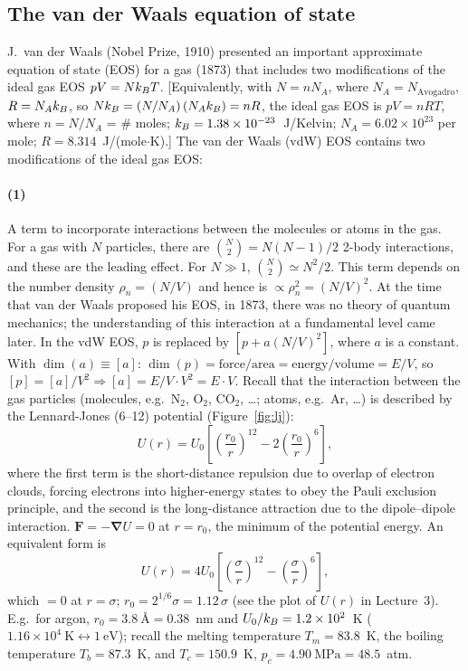 \subsection{The van der Waals equation of state}

J.~van der Waals (Nobel Prize, 1910) presented an important approximate equation of state (EOS) for a gas
(1873) that includes two modifications of the ideal gas EOS $pV = Nk_{B} T$. [Equivalently, with $N = nN_A$,
where $N_A = N_{\text{Avogadro}}$, $R = N_Ak_{B}$, so $Nk_{B} = \left(N/N_A\right)(N_Ak_{B}) = nR$, the ideal gas EOS is
$pV = nRT$, where $n = N/N_A$ = \# moles; $k_{B} = 1.38\times 10^{-23}$~J/Kelvin;
$N_A = 6.02\times 10^{23}$ per mole; $R = 8.314$~J/(mole$\cdot$K).] The van der Waals (vdW) EOS contains two
modifications of the ideal gas EOS:

\paragraph{(1)} A term to incorporate interactions between the molecules or atoms in the gas. For a gas with $N$
particles, there are $\binom N2 = N(N-1)/2$ 2-body interactions, and these are the leading effect. For
$N\gg 1$, $\binom N2\simeq N^2/2$. This term depends on the number density $\rho_n = \left(N/V\right)$ and hence
is $\propto\rho_n^2 = \left(N/V\right)^2$. At the time that van der Waals proposed his EOS, in 1873, there was no theory
of quantum mechanics; the understanding of this interaction at a fundamental level came later. In the vdW EOS,
$p$ is replaced by $\left[p + a\left(N/V\right)^2\right]$, where $a$ is a constant. With $\dim(a)\equiv[a]$:
$\dim(p) = \text{force}/\text{area} = \text{energy}/\text{volume} = E/V$, so
$[p] = [a]/V^2\Rightarrow[a] = E/V\cdot V^2 = E\cdot V$. Recall that the interaction between the gas
particles (molecules, e.g.\ N$_2$, O$_2$, CO$_2$, \ldots; atoms, e.g.\ Ar, \ldots) is described by the
Lennard-Jones (6--12) potential (Figure~\ref{fig:lj}):
\begin{equation}
  U(r) = U_0\left[\left(\frac{r_0}{r}\right)^{12} - 2\left(\frac{r_0}{r}\right)^6\right],
\end{equation}
where the first term is the short-distance repulsion due to overlap of electron clouds, forcing electrons into
higher-energy states to obey the Pauli exclusion principle, and the second is the long-distance attraction due
to the dipole--dipole interaction. $\mathbf F = -\boldsymbol\nabla U = 0$ at $r = r_0$, the minimum of the
potential energy. An equivalent form is
\begin{equation}
  U(r) = 4U_0\left[\left(\frac{\sigma}{r}\right)^{12} - \left(\frac{\sigma}{r}\right)^6\right],
\end{equation}
which $=0$ at $r = \sigma$; $r_0 = 2^{1/6}\sigma = 1.12\,\sigma$ (see the plot of $U(r)$ in Lecture~3).
E.g.\ for argon, $r_0 = 3.8\ \text{\AA} = 0.38$~nm and $U_0/k_{B} = 1.2\times 10^2$~K
($1.16\times 10^4\ \text{K}\leftrightarrow 1\ \text{eV}$); recall the melting temperature $T_m = 83.8$~K, the
boiling temperature $T_b = 87.3$~K, and $T_c = 150.9$~K, $p_c = 4.90\ \text{MPa} = 48.5$~atm.

